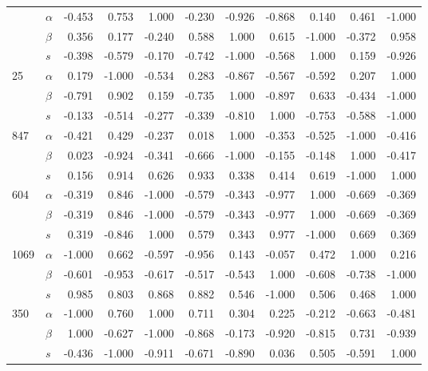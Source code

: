 \begin{longtable}{llrrrrrrrrr}
\bottomrule
\endlastfoot
\multirow{3}{*}{558} & $\alpha$ & -0.453 &  0.753 &  1.000 & -0.230 & -0.926 & -0.868 &  0.140 &  0.461 & -1.000 \\
     & $\beta$ &  0.356 &  0.177 & -0.240 &  0.588 &  1.000 &  0.615 & -1.000 & -0.372 &  0.958 \\
     & $s$ & -0.398 & -0.579 & -0.170 & -0.742 & -1.000 & -0.568 &  1.000 &  0.159 & -0.926 \\
\cline{1-11}
\multirow{3}{*}{25} & $\alpha$ &  0.179 & -1.000 & -0.534 &  0.283 & -0.867 & -0.567 & -0.592 &  0.207 &  1.000 \\
     & $\beta$ & -0.791 &  0.902 &  0.159 & -0.735 &  1.000 & -0.897 &  0.633 & -0.434 & -1.000 \\
     & $s$ & -0.133 & -0.514 & -0.277 & -0.339 & -0.810 &  1.000 & -0.753 & -0.588 & -1.000 \\
\cline{1-11}
\multirow{3}{*}{847} & $\alpha$ & -0.421 &  0.429 & -0.237 &  0.018 &  1.000 & -0.353 & -0.525 & -1.000 & -0.416 \\
     & $\beta$ &  0.023 & -0.924 & -0.341 & -0.666 & -1.000 & -0.155 & -0.148 &  1.000 & -0.417 \\
     & $s$ &  0.156 &  0.914 &  0.626 &  0.933 &  0.338 &  0.414 &  0.619 & -1.000 &  1.000 \\
\cline{1-11}
\multirow{3}{*}{604} & $\alpha$ & -0.319 &  0.846 & -1.000 & -0.579 & -0.343 & -0.977 &  1.000 & -0.669 & -0.369 \\
     & $\beta$ & -0.319 &  0.846 & -1.000 & -0.579 & -0.343 & -0.977 &  1.000 & -0.669 & -0.369 \\
     & $s$ &  0.319 & -0.846 &  1.000 &  0.579 &  0.343 &  0.977 & -1.000 &  0.669 &  0.369 \\
\cline{1-11}
\multirow{3}{*}{1069} & $\alpha$ & -1.000 &  0.662 & -0.597 & -0.956 &  0.143 & -0.057 &  0.472 &  1.000 &  0.216 \\
     & $\beta$ & -0.601 & -0.953 & -0.617 & -0.517 & -0.543 &  1.000 & -0.608 & -0.738 & -1.000 \\
     & $s$ &  0.985 &  0.803 &  0.868 &  0.882 &  0.546 & -1.000 &  0.506 &  0.468 &  1.000 \\
\cline{1-11}
\multirow{3}{*}{350} & $\alpha$ & -1.000 &  0.760 &  1.000 &  0.711 &  0.304 &  0.225 & -0.212 & -0.663 & -0.481 \\
     & $\beta$ &  1.000 & -0.627 & -1.000 & -0.868 & -0.173 & -0.920 & -0.815 &  0.731 & -0.939 \\
     & $s$ & -0.436 & -1.000 & -0.911 & -0.671 & -0.890 &  0.036 &  0.505 & -0.591 &  1.000 \\

\end{longtable}
